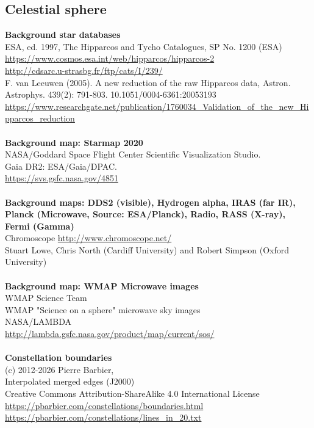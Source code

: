 \documentclass[Orbiter User Manual.tex]{subfiles}
\begin{document}
\subsection{Celestial sphere}
\textbf{Background star databases}\\
ESA, ed. 1997, The Hipparcos and Tycho Catalogues, SP No. 1200 (ESA)\\
\url{https://www.cosmos.esa.int/web/hipparcos/hipparcos-2}\\
\url{http://cdsarc.u-strasbg.fr/ftp/cats/I/239/}\\
F. van Leeuwen (2005). A new reduction of the raw Hipparcos data, Astron. Astrophys. 439(2): 791-803. 10.1051/0004-6361:20053193\\
\url{https://www.researchgate.net/publication/1760034_Validation_of_the_new_Hipparcos_reduction}\\
\\
\textbf{Background map: Starmap 2020}\\
NASA/Goddard Space Flight Center Scientific Visualization Studio.\\
Gaia DR2: ESA/Gaia/DPAC.\\
\url{https://svs.gsfc.nasa.gov/4851}\\
\\
\textbf{Background maps: DDS2 (visible), Hydrogen alpha, IRAS (far IR), Planck (Microwave, Source: ESA/Planck), Radio, RASS (X-ray), Fermi (Gamma)}\\
Chromoscope \url{http://www.chromoscope.net/}\\
Stuart Lowe, Chris North (Cardiff University) and Robert Simpson (Oxford University)\\
\\
\textbf{Background map: WMAP Microwave images}\\
WMAP Science Team\\
WMAP "Science on a sphere" microwave sky images\\
NASA/LAMBDA\\
\url{http://lambda.gsfc.nasa.gov/product/map/current/sos/}\\
\\
\textbf{Constellation boundaries}\\
(c) 2012-2026 Pierre Barbier,\\
Interpolated merged edges (J2000)\\
Creative Commons Attribution-ShareAlike 4.0 International License\\
\url{https://pbarbier.com/constellations/boundaries.html}\\
\url{https://pbarbier.com/constellations/lines_in_20.txt}\\
\end{document}
